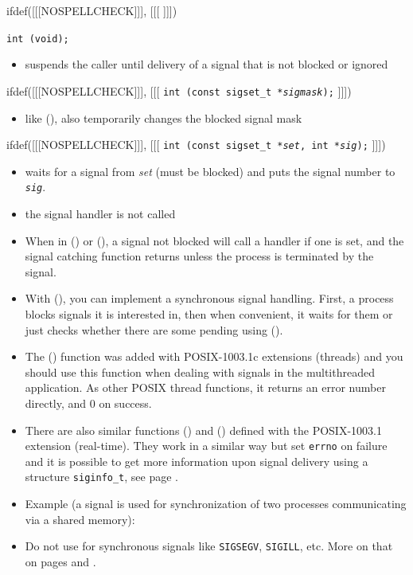 
ifdef([[[NOSPELLCHECK]]], [[[
]]])

\begin{slide}
\texttt{int (void);}
\begin{itemize}
\item suspends the caller until delivery of a signal that is not blocked or
ignored
\end{itemize}
ifdef([[[NOSPELLCHECK]]], [[[
\texttt{int (const sigset\_t *\emph{sigmask});}
]]])
\begin{itemize}
\item like (), also temporarily changes the blocked signal mask
\end{itemize}
ifdef([[[NOSPELLCHECK]]], [[[
\texttt{int (const sigset\_t *\emph{set}, int *\emph{sig});}
]]])
\begin{itemize}
\item waits for a signal from \emph{set} (must be blocked) and puts the signal
number to \emph{\texttt{sig}}.
\item the signal handler is not called
\end{itemize}
\end{slide}

\begin{itemize}
\item When in () or (), a signal not blocked will
call a handler if one is set, and the signal catching function returns unless
the process is terminated by the signal.
\item With (), you can implement a synchronous signal
handling.  First, a process blocks signals it is interested in, then when
convenient, it waits for them or just checks whether there are some pending
using ().
\item The () function was added with POSIX-1003.1c
extensions (threads) and you should use this function when dealing with signals
in the multithreaded application.  As other POSIX thread functions, it returns
an error number directly, and 0 on success.
\item {} There are also similar functions ()
and () defined with the POSIX-1003.1 extension
(real-time).  They work in a similar way but set \texttt{errno} on failure and
it is possible to get more information upon signal delivery using a structure
\texttt{siginfo\_t}, see page \pageref{REALTIMEEXTENSIONS}.
\item Example (a signal is used for synchronization of two processes
communicating via a shared memory): 
\item Do not use for synchronous signals like \texttt{SIGSEGV}, \texttt{SIGILL},
etc.  More on that on pages \pageref{SPECIALSIGNALS} and
\pageref{THREADS_SIGWAIT}.
\end{itemize}

\endinput
